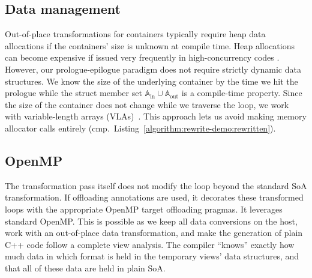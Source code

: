 





\subsection{Data management}

Out-of-place transformations for containers typically require heap data allocations if the containers' size is unknown at compile time.
Heap allocations can become expensive if issued very frequently in high-concurrency codes \cite{Hager:2011:HPCIntro}.
However, our prologue-epilogue paradigm does not require strictly dynamic data structures.
We know the size of the underlying container by the time we hit the prologue while the struct member set $\mathbb{A}_{\text{in}} \cup \mathbb{A}_{\text{out}}$ is a compile-time property.
Since the size of the container does not change while we traverse the loop, we work with variable-length arrays (VLAs)~\cite{Cheng:1995:VariableLengthArrays}. This approach lets us avoid making memory allocator calls entirely (cmp.~Listing~\ref{algorithm:rewrite-demo:rewritten}).

\subsection{OpenMP}

The transformation pass itself does not modify the loop beyond the standard SoA transformation.
If offloading annotations are used, it decorates these transformed loops with the appropriate OpenMP target offloading pragmas.
It leverages standard OpenMP. 
This is possible as we keep all data conversions on the host, work with an out-of-place data transformation, and make the generation of plain C++ code follow a complete view analysis.
The compiler ``knows'' exactly how much data in which format is held in the temporary views' data structures, and that all of these data are held in plain SoA.


